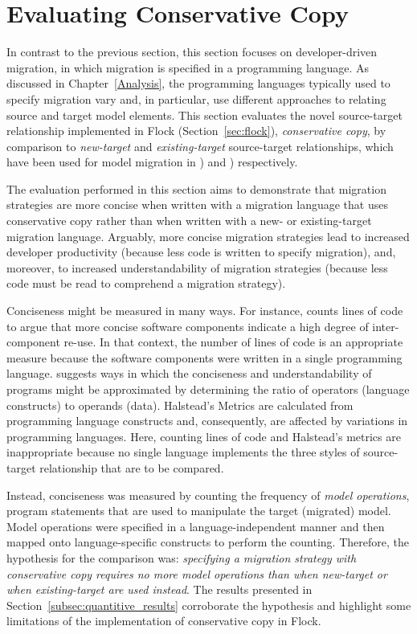 
\section{Evaluating Conservative Copy}
\label{sec:quantitive}
In contrast to the previous section, this section focuses on developer-driven migration, in which migration is specified in a programming language. As discussed in Chapter~\ref{Analysis}, the programming languages typically used to specify migration vary and, in particular, use different approaches to relating source and target model elements. This section evaluates the novel source-target relationship implemented in Flock (Section~\ref{sec:flock}), \emph{conservative copy}, by comparison to \emph{new-target} and \emph{existing-target} source-target relationships, which have been used for model migration in \cite{cicchetti08automating,garces09managing}) and \cite{herrmannsdoerfer09cope,hussey06advanced}) respectively.

The evaluation performed in this section aims to demonstrate that migration strategies are more concise when written with a migration language that uses conservative copy rather than when written with a new- or existing-target migration language. Arguably, more concise migration strategies lead to increased developer productivity (because less code is written to specify migration), and, moreover, to increased understandability of migration strategies (because less code must be read to comprehend a migration strategy).

Conciseness might be measured in many ways. For instance, \cite{kolovos09thesis} counts lines of code to argue that more concise software components indicate a high degree of inter-component re-use. In that context, the number of lines of code is an appropriate measure because the software components were written in a single programming language. \cite{halstead77softwarescience} suggests ways in which the conciseness and understandability of programs might be approximated by determining the ratio of operators (language constructs) to operands (data). Halstead's Metrics are calculated from programming language constructs and, consequently, are affected by variations in programming languages. Here, counting lines of code and Halstead's metrics are inappropriate because no single language implements the three styles of source-target relationship that are to be compared.

Instead, conciseness was measured by counting the frequency of \emph{model operations}, program statements that are used to manipulate the target (migrated) model. Model operations were specified in a language-independent manner and then mapped onto language-specific constructs to perform the counting. Therefore, the hypothesis for the comparison was: \emph{specifying a migration strategy with conservative copy requires no more model operations than when new-target or when existing-target are used instead}. The results presented in Section~\ref{subsec:quantitive_results} corroborate the hypothesis and highlight some limitations of the implementation of conservative copy in Flock.

